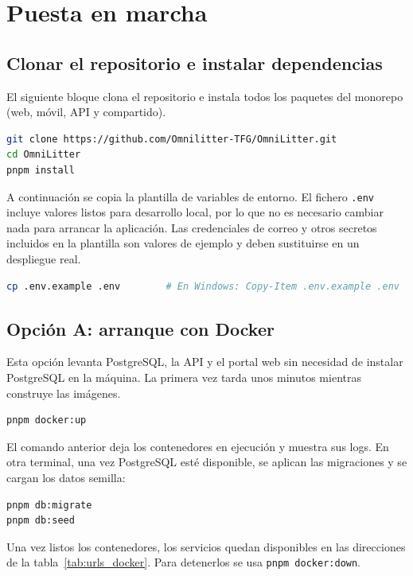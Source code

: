 \section{Puesta en marcha}

\subsection{Clonar el repositorio e instalar dependencias}

El siguiente bloque clona el repositorio e instala todos los paquetes del monorepo
(web, móvil, API y compartido).

\begin{lstlisting}[language=bash]
git clone https://github.com/Omnilitter-TFG/OmniLitter.git
cd OmniLitter
pnpm install
\end{lstlisting}

A continuación se copia la plantilla de variables de entorno. El fichero \texttt{.env}
incluye valores listos para desarrollo local, por lo que no es necesario cambiar nada
para arrancar la aplicación. Las credenciales de correo y otros secretos incluidos en
la plantilla son valores de ejemplo y deben sustituirse en un despliegue real.

\begin{lstlisting}[language=bash]
cp .env.example .env        # En Windows: Copy-Item .env.example .env
\end{lstlisting}

\subsection{Opción A: arranque con Docker}

Esta opción levanta PostgreSQL, la API y el portal web sin necesidad de instalar
PostgreSQL en la máquina. La primera vez tarda unos minutos mientras construye las
imágenes.

\begin{lstlisting}[language=bash]
pnpm docker:up
\end{lstlisting}

El comando anterior deja los contenedores en ejecución y muestra sus logs. En otra
terminal, una vez PostgreSQL esté disponible, se aplican las migraciones y se cargan
los datos semilla:

\begin{lstlisting}[language=bash]
pnpm db:migrate
pnpm db:seed
\end{lstlisting}

Una vez listos los contenedores, los servicios quedan disponibles en las direcciones de
la tabla~\ref{tab:urls_docker}. Para detenerlos se usa \texttt{pnpm docker:down}.

